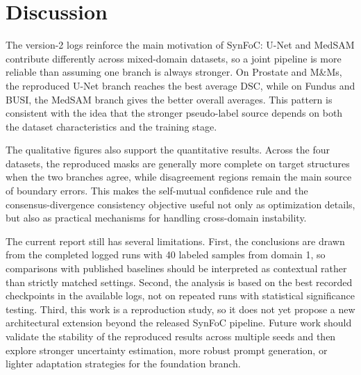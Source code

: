 \section{Discussion}
The version-2 logs reinforce the main motivation of SynFoC: U-Net and MedSAM contribute differently across mixed-domain datasets, so a joint pipeline is more reliable than assuming one branch is always stronger. On Prostate and M\&Ms, the reproduced U-Net branch reaches the best average DSC, while on Fundus and BUSI, the MedSAM branch gives the better overall averages. This pattern is consistent with the idea that the stronger pseudo-label source depends on both the dataset characteristics and the training stage.

The qualitative figures also support the quantitative results. Across the four datasets, the reproduced masks are generally more complete on target structures when the two branches agree, while disagreement regions remain the main source of boundary errors. This makes the self-mutual confidence rule and the consensus-divergence consistency objective useful not only as optimization details, but also as practical mechanisms for handling cross-domain instability.

The current report still has several limitations. First, the conclusions are drawn from the completed logged runs with 40 labeled samples from domain 1, so comparisons with published baselines should be interpreted as contextual rather than strictly matched settings. Second, the analysis is based on the best recorded checkpoints in the available logs, not on repeated runs with statistical significance testing. Third, this work is a reproduction study, so it does not yet propose a new architectural extension beyond the released SynFoC pipeline. Future work should validate the stability of the reproduced results across multiple seeds and then explore stronger uncertainty estimation, more robust prompt generation, or lighter adaptation strategies for the foundation branch.

